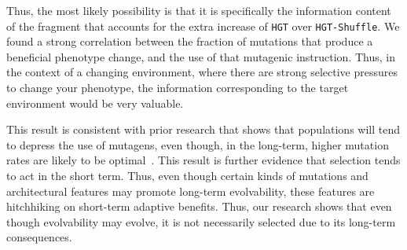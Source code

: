 \documentclass[PhD]{msu-thesis}
\begin{document}
Thus, the most likely possibility is that it is specifically the information content of the fragment that accounts for the extra increase of \texttt{HGT} over \texttt{HGT-Shuffle}. We found a strong correlation between the fraction of mutations that produce a beneficial phenotype change, and the use of that mutagenic instruction. Thus, in the context of a changing environment, where there are strong selective pressures to change your phenotype, the information corresponding to the target environment would be very valuable. 

This result is consistent with prior research that shows that populations will tend to depress the use of mutagens, even though, in the long-term, higher mutation rates are likely to be optimal~\cite{clune_natural_2008}. This result is further evidence that selection tends to act in the short term. Thus, even though certain kinds of mutations and architectural features may promote long-term evolvability, these features are hitchhiking on short-term adaptive benefits. Thus, our research shows that even though evolvability may evolve, it is not necessarily selected due to its long-term consequences. 

\end{document}
